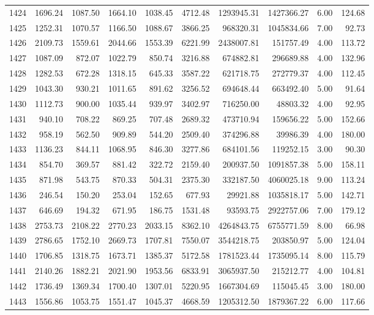 \begin{tabular}{lrrrrrrrrr}
1424 & 1696.24 & 1087.50 & 1664.10 & 1038.45 & 4712.48 & 1293945.31 & 1427366.27 & 6.00 & 124.68 \\
1425 & 1252.31 & 1070.57 & 1166.50 & 1088.67 & 3866.25 & 968320.31 & 1045834.66 & 7.00 & 92.73 \\
1426 & 2109.73 & 1559.61 & 2044.66 & 1553.39 & 6221.99 & 2438007.81 & 151757.49 & 4.00 & 113.72 \\
1427 & 1087.09 & 872.07 & 1022.79 & 850.74 & 3216.88 & 674882.81 & 296689.88 & 4.00 & 132.96 \\
1428 & 1282.53 & 672.28 & 1318.15 & 645.33 & 3587.22 & 621718.75 & 272779.37 & 4.00 & 112.45 \\
1429 & 1043.30 & 930.21 & 1011.65 & 891.62 & 3256.52 & 694648.44 & 663492.40 & 5.00 & 91.64 \\
1430 & 1112.73 & 900.00 & 1035.44 & 939.97 & 3402.97 & 716250.00 & 48803.32 & 4.00 & 92.95 \\
1431 & 940.10 & 708.22 & 869.25 & 707.48 & 2689.32 & 473710.94 & 159656.22 & 5.00 & 152.66 \\
1432 & 958.19 & 562.50 & 909.89 & 544.20 & 2509.40 & 374296.88 & 39986.39 & 4.00 & 180.00 \\
1433 & 1136.23 & 844.11 & 1068.95 & 846.30 & 3277.86 & 684101.56 & 119252.15 & 3.00 & 90.30 \\
1434 & 854.70 & 369.57 & 881.42 & 322.72 & 2159.40 & 200937.50 & 1091857.38 & 5.00 & 158.11 \\
1435 & 871.98 & 543.75 & 870.33 & 504.31 & 2375.30 & 332187.50 & 4060025.18 & 9.00 & 113.24 \\
1436 & 246.54 & 150.20 & 253.04 & 152.65 & 677.93 & 29921.88 & 1035818.17 & 5.00 & 142.71 \\
1437 & 646.69 & 194.32 & 671.95 & 186.75 & 1531.48 & 93593.75 & 2922757.06 & 7.00 & 179.12 \\
1438 & 2753.73 & 2108.22 & 2770.23 & 2033.15 & 8362.10 & 4264843.75 & 6755771.59 & 8.00 & 66.98 \\
1439 & 2786.65 & 1752.10 & 2669.73 & 1707.81 & 7550.07 & 3544218.75 & 203850.97 & 5.00 & 124.04 \\
1440 & 1706.85 & 1318.75 & 1673.71 & 1385.37 & 5172.58 & 1781523.44 & 1735095.14 & 8.00 & 115.79 \\
1441 & 2140.26 & 1882.21 & 2021.90 & 1953.56 & 6833.91 & 3065937.50 & 215212.77 & 4.00 & 104.81 \\
1442 & 1736.49 & 1369.34 & 1700.40 & 1307.01 & 5220.95 & 1667304.69 & 115045.45 & 3.00 & 180.00 \\
1443 & 1556.86 & 1053.75 & 1551.47 & 1045.37 & 4668.59 & 1205312.50 & 1879367.22 & 6.00 & 117.66 \\

\end{tabular}
